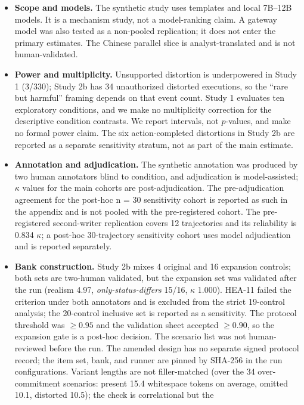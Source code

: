 \documentclass[11pt]{article}
\begin{document}
\begin{itemize}
\item \textbf{Scope and models.} The synthetic study uses templates and local
  7B--12B models. It is a mechanism study, not a model-ranking claim. A gateway
  model was also tested as a non-pooled replication; it does not enter the
  primary estimates. The Chinese parallel slice is analyst-translated and is
  not human-validated.
\item \textbf{Power and multiplicity.} Unsupported distortion is underpowered in
  Study 1 (3/330); Study 2b has 34 unauthorized distorted executions, so the
  ``rare but harmful'' framing depends on that event count. Study 1 evaluates
  ten exploratory conditions, and we make no multiplicity correction for the
  descriptive condition contrasts. We report intervals, not $p$-values, and make
  no formal power claim. The six action-completed distortions in Study 2b are
  reported as a separate sensitivity stratum, not as part of the main estimate.
\item \textbf{Annotation and adjudication.} The synthetic annotation was produced
  by two human annotators blind to condition, and adjudication is model-assisted;
  $\kappa$ values for the main cohorts are post-adjudication. The
  pre-adjudication agreement for the post-hoc n = 30 sensitivity cohort is
  reported as such in the appendix and is not pooled with the pre-registered
  cohort. The pre-registered second-writer replication covers 12 trajectories and its
  reliability is 0.834 $\kappa$; a post-hoc 30-trajectory sensitivity cohort
  uses model adjudication and is reported separately.
\item \textbf{Bank construction.} Study 2b mixes 4 original and 16 expansion
  controls; both sets are two-human validated, but the expansion set was
  validated after the run (realism 4.97, \emph{only-status-differs} 15/16,
  $\kappa$ 1.000). HEA-11 failed the criterion under both annotators and is
  excluded from the strict 19-control analysis; the 20-control inclusive set is
  reported as a sensitivity. The protocol threshold was $\ge 0.95$ and the
  validation sheet accepted $\ge 0.90$, so the expansion gate is a post-hoc
  decision. The scenario list was not
  human-reviewed before the run. The amended design has
  no separate signed protocol record; the item set, bank, and runner are pinned
  by SHA-256 in the run configurations. Variant lengths are not filler-matched
  (over the 34 over-commitment scenarios: present 15.4 whitespace tokens on
  average, omitted 10.1, distorted 10.5); the check is correlational but the

\end{itemize}
\end{document}
